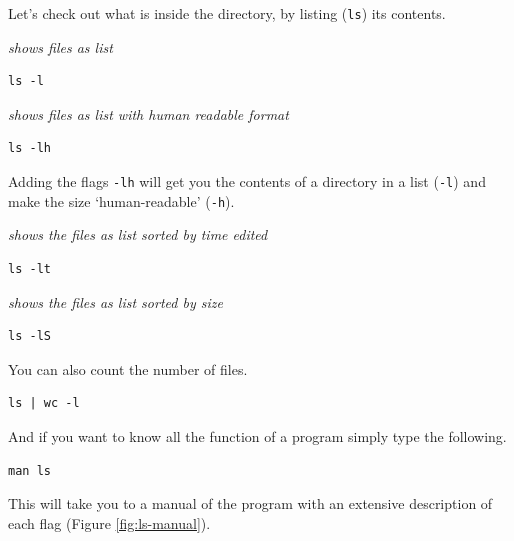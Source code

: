 \documentclass[
]{book}
\newcommand{\passthrough}[1]{#1}
\begin{document}
Let's check out what is inside the directory, by listing (\passthrough{\lstinline!ls!}) its contents.

\emph{shows files as list}

\begin{lstlisting}
ls -l 
\end{lstlisting}

\emph{shows files as list with human readable format }

\begin{lstlisting}
ls -lh 
\end{lstlisting}

Adding the flags \passthrough{\lstinline!-lh!} will get you the contents of a directory in a list (\passthrough{\lstinline!-l!}) and make the size `human-readable' (\passthrough{\lstinline!-h!}).

\emph{shows the files as list sorted by time edited}

\begin{lstlisting}
ls -lt 
\end{lstlisting}

\emph{shows the files as list sorted by size}

\begin{lstlisting}
ls -lS 
\end{lstlisting}

You can also count the number of files.

\begin{lstlisting}
ls | wc -l
\end{lstlisting}

And if you want to know all the function of a program simply type the following.

\begin{lstlisting}
man ls
\end{lstlisting}

This will take you to a manual of the program with an extensive description of each flag (Figure \ref{fig:ls-manual}).
\end{document}
